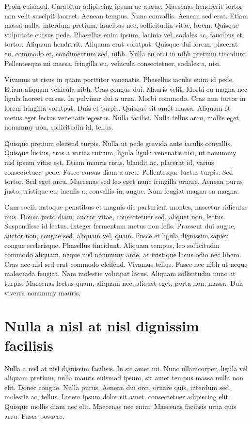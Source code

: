 \documentclass[printmode]{mgr}
\begin{document}
Proin euismod. Curabitur adipiscing ipsum ac augue. Maecenas hendrerit
tortor non velit suscipit laoreet. Aenean tempus. Nunc
convallis. Aenean sed erat. Etiam massa nulla, interdum pretium,
faucibus nec, sollicitudin vitae, lorem. Quisque vulputate cursus
pede. Phasellus enim ipsum, lacinia vel, sodales ac, faucibus et,
tortor. Aliquam hendrerit. Aliquam erat volutpat. Quisque dui lorem,
placerat eu, commodo et, condimentum sed, nibh. Nulla eu orci in nibh
pretium tincidunt. Pellentesque mi massa, fringilla eu, vehicula
consectetuer, sodales a, nisi.

Vivamus ut risus in quam porttitor venenatis. Phasellus iaculis enim
id pede. Etiam aliquam vehicula nibh. Cras congue dui. Mauris
velit. Morbi eu magna nec ligula laoreet cursus. In pulvinar dui a
urna. Morbi commodo. Cras non tortor in lorem fringilla volutpat. Duis
et turpis. Quisque sit amet massa. Aliquam et metus eget lectus
venenatis egestas. Nulla facilisi. Nulla tellus arcu, mollis eget,
nonummy non, sollicitudin id, tellus.

Quisque pretium eleifend turpis. Nulla ut pede gravida ante iaculis
convallis. Quisque luctus, eros a varius rutrum, ligula ligula
venenatis nisi, ut nonummy nisl ipsum vitae est. Etiam mauris risus,
blandit ac, placerat id, varius consectetuer, pede. Fusce cursus diam
a arcu. Pellentesque luctus turpis. Sed tortor. Sed eget
arcu. Maecenas sed leo eget nunc fringilla ornare. Aenean purus justo,
tristique eu, iaculis a, convallis in, augue. Nam feugiat magna eu
magna.

Cum sociis natoque penatibus et magnis dis parturient montes, nascetur
ridiculus mus. Donec justo diam, auctor vitae, consectetuer sed,
aliquet non, lectus. Suspendisse id lectus. Integer fermentum metus
non felis. Praesent dui augue, auctor non, congue sed, aliquam vel,
quam. Fusce et ligula dignissim sapien congue scelerisque. Phasellus
tincidunt. Aliquam tempus, leo sollicitudin commodo aliquam, neque
nisl nonummy ante, ac tristique lacus odio nec libero. Cras nec nisl
sed erat commodo eleifend. Vivamus tellus. Fusce nec nibh ut neque
malesuada feugiat. Nam molestie volutpat lacus. Aliquam sollicitudin
nunc at turpis. Maecenas lectus quam, aliquam nec, aliquet eget, porta
non, massa. Duis viverra nonummy mauris.


\chapter{Nulla a nisl at nisl dignissim facilisis}
Nulla a nisl at nisl dignissim facilisis. In sit amet mi. Nunc
ullamcorper, ligula vel aliquam pretium, nulla mauris euismod ipsum,
sit amet tempus massa nulla non elit. Donec congue. Nulla
purus. Aenean dui orci, ornare quis, interdum sed, molestie ac,
tellus. Lorem ipsum dolor sit amet, consectetuer adipiscing
elit. Quisque mollis diam nec elit. Maecenas nec enim. Maecenas
facilisis urna quis arcu. Fusce posuere.
\end{document}
